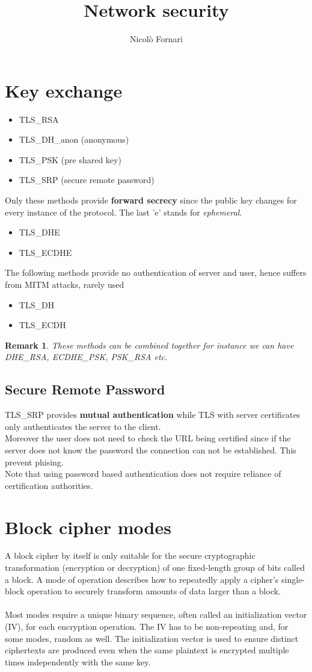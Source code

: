 \documentclass[10pt,a4paper]{article}
\author{Nicolò Fornari}
\title{Network security}
\newtheorem{remark}{Remark}
\begin{document}
\section{Key exchange}

\begin{itemize}
\item TLS\_RSA
\item TLS\_DH\_anon (anonymous)
\item TLS\_PSK (pre shared key)
\item TLS\_SRP (secure remote password)
\end{itemize}

Only these methods provide {\bf forward secrecy} since the public key changes for every instance of the protocol. The last 'e' stands for \textit{ephemeral}.
\begin{itemize}
\item TLS\_DHE
\item TLS\_ECDHE
\end{itemize}
\vspace{1em}
The following methods provide no authentication of server and user, hence suffers from MITM attacks, rarely used
\begin{itemize}
\item TLS\_DH
\item TLS\_ECDH
\end{itemize}
\begin{remark}
These methods can be combined together for instance we can have DHE\_RSA, ECDHE\_PSK, PSK\_RSA etc.
\end{remark}


\subsection{Secure Remote Password}
TLS\_SRP provides {\bf mutual authentication } while TLS with server certificates only authenticates the server to the client.\\
Moreover the user does not need to check the URL being certified since if the server does not know the password the connection can not be established. This prevent phising. \\
Note that using password based authentication does not require reliance of certification authorities.

\section{Block cipher modes}
A block cipher by itself is only suitable for the secure cryptographic transformation (encryption or decryption) of one fixed-length group of bits called a block. A mode of operation describes how to repeatedly apply a cipher's single-block operation to securely transform amounts of data larger than a block.\\\\
Most modes require a unique binary sequence, often called an initialization vector (IV), for each encryption operation. The IV has to be non-repeating and, for some modes, random as well. The initialization vector is used to ensure distinct ciphertexts are produced even when the same plaintext is encrypted multiple times independently with the same key.
\end{document}
